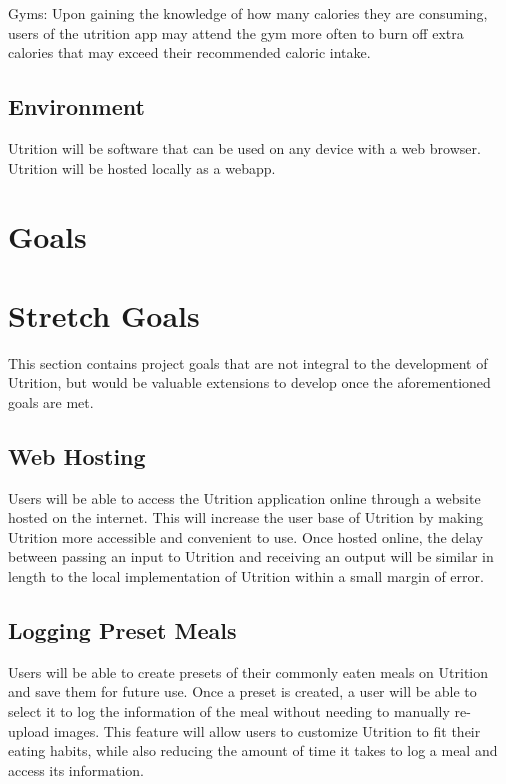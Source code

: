 \documentclass{article}
\begin{document}
Gyms: Upon gaining the knowledge of how many calories they are consuming, users of the utrition app may attend the gym more often to burn off extra calories that may exceed their recommended caloric intake. 


\subsection{Environment}

Utrition will be software that can be used on any device with a web browser. Utrition will be hosted locally as a webapp. 

\section{Goals}

\section{Stretch Goals}

This section contains project goals that are not integral to the development of Utrition, but would be valuable extensions to develop once the aforementioned goals are met.

\subsection{Web Hosting}

Users will be able to access the Utrition application online through a website hosted on the internet. This will increase the user base of Utrition by making Utrition more accessible and convenient to use. Once hosted online, the delay between passing an input to Utrition and receiving an output will be similar in length to the local implementation of Utrition within a small margin of error.

\subsection{Logging Preset Meals}

Users will be able to create presets of their commonly eaten meals on Utrition and save them for future use. Once a preset is created, a user will be able to select it to log the information of the meal without needing to manually re-upload images. This feature will allow users to customize Utrition to fit their eating habits, while also reducing the amount of time it takes to log a meal and access its information.
\end{document}
